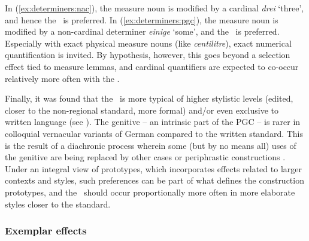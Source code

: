\begin{exe}
  \ex\label{ex:determiners} 
  \begin{xlist}
  \end{xlist}
\end{exe}

In (\ref{ex:determiners:nac}), the measure noun is modified by a cardinal \textit{drei} `three', and hence the \NACa\ is preferred.
In (\ref{ex:determiners:pgc}), the measure noun is modified by a non-cardinal determiner \textit{einige} `some', and the \PGCa\ is preferred.
Especially with exact physical measure nouns (like \textit{centilitre}), exact numerical quantification is invited.
By hypothesis, however, this goes beyond a selection effect tied to measure lemmas, and cardinal quantifiers are expected to co-occur relatively more often with the \NACa.

Finally, it was found that the \PGCa\ is more typical of higher stylistic levels (edited, closer to the non-regional standard, more formal) and\slash or even exclusive to written language (see \citealp[320--323]{Hentschel1993}).
The genitive -- an intrinsic part of the PGC -- is rarer in colloquial vernacular variants of German compared to the written standard.
This is the result of a diachronic process wherein some (but by no means all) uses of the genitive are being replaced by other cases or periphrastic constructions \citep{FleischerSchallert2011}.
Under an integral view of prototypes, which incorporates effects related to larger contexts and styles, such preferences can be part of what defines the construction prototypes, and the \PGCa\ should occur proportionally more often in more elaborate styles closer to the standard.

\subsubsection{Exemplar effects}
\label{sec:exemplareffects}

